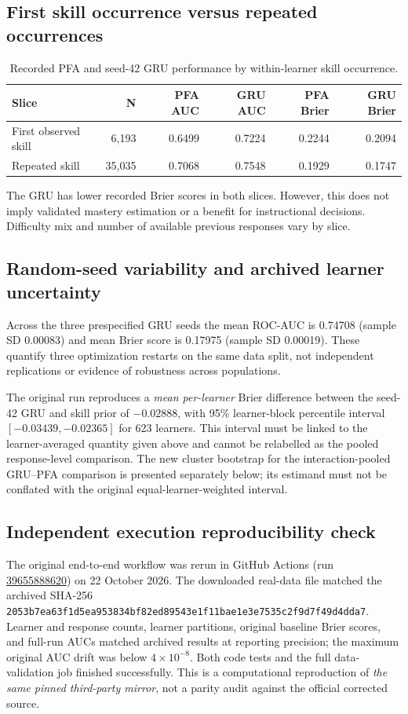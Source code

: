 \documentclass[11pt,a4paper]{article}
\begin{document}
\subsection{First skill occurrence versus repeated occurrences}
\begin{table}[ht]\centering\small
\caption{Recorded PFA and seed-42 GRU performance by within-learner skill occurrence.}\begin{tabular}{lrrrrr}\toprule
Slice & N & PFA AUC & GRU AUC & PFA Brier & GRU Brier\\\midrule
First observed skill & 6,193 & 0.6499 & 0.7224 & 0.2244 & 0.2094\\
Repeated skill & 35,035 & 0.7068 & 0.7548 & 0.1929 & 0.1747\\\bottomrule
\end{tabular}\end{table}
The GRU has lower recorded Brier scores in both slices. However, this does not imply validated mastery estimation or a benefit for instructional decisions. Difficulty mix and number of available previous responses vary by slice.

\subsection{Random-seed variability and archived learner uncertainty}
Across the three prespecified GRU seeds the mean ROC-AUC is 0.74708 (sample SD 0.00083) and mean Brier score is 0.17975 (sample SD 0.00019). These quantify three optimization restarts on the same data split, not independent replications or evidence of robustness across populations.

The original run reproduces a \emph{mean per-learner} Brier difference between the seed-42 GRU and skill prior of $-0.02888$, with 95\% learner-block percentile interval $[-0.03439,-0.02365]$ for 623 learners. This interval must be linked to the learner-averaged quantity given above and cannot be relabelled as the pooled response-level comparison. The new cluster bootstrap for the interaction-pooled GRU--PFA comparison is presented separately below; its estimand must not be conflated with the original equal-learner-weighted interval.

\subsection{Independent execution reproducibility check}
The original end-to-end workflow was rerun in GitHub Actions (run \href{https://github.com/devissaputra/knowledge_tracing_benchmark/actions/runs/39655888620}{39655888620}) on 22 October 2026. The downloaded real-data file matched the archived SHA-256 \texttt{2053b7ea63f1d5ea953834bf82ed89543e1f11bae1e3e7535c2f9d7f49d4dda7}. Learner and response counts, learner partitions, original baseline Brier scores, and full-run AUCs matched archived results at reporting precision; the maximum original AUC drift was below $4\times10^{-8}$. Both code tests and the full data-validation job finished successfully. This is a computational reproduction of \emph{the same pinned third-party mirror}, not a parity audit against the official corrected source.
\end{document}
